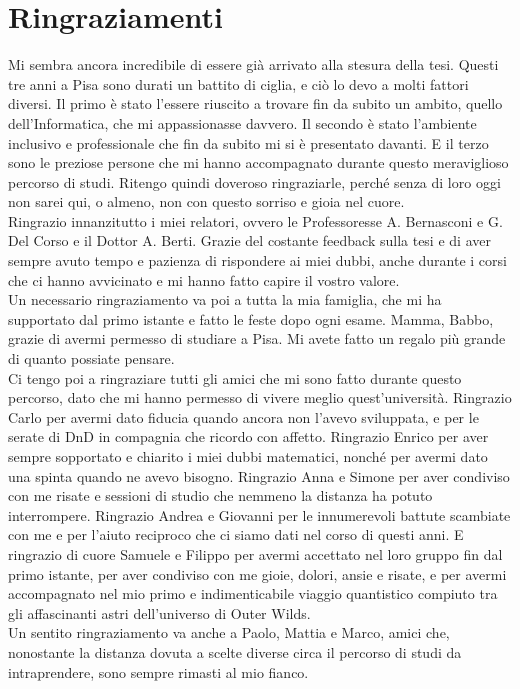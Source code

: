 \documentclass{book}
\theoremstyle{definition}
\theoremstyle{definition}
\theoremstyle{definition}
\theoremstyle{plain}
\theoremstyle{plain}
\theoremstyle{plain}
\theoremstyle{plain}
\begin{document}
\chapter*{Ringraziamenti}
Mi sembra ancora incredibile di essere già arrivato alla stesura della tesi. Questi tre anni a Pisa sono durati un battito di ciglia, e ciò lo devo a molti fattori diversi. Il primo è stato l'essere riuscito a trovare fin da subito un ambito, quello dell'Informatica, che mi appassionasse davvero. Il secondo è stato l'ambiente inclusivo e professionale che fin da subito mi si è presentato davanti. E il terzo sono le preziose persone che mi hanno accompagnato durante questo meraviglioso percorso di studi. Ritengo quindi doveroso ringraziarle, perché senza di loro oggi non sarei qui, o almeno, non con questo sorriso e gioia nel cuore.\\
\indent Ringrazio innanzitutto i miei relatori, ovvero le Professoresse A. Bernasconi e G. Del Corso e il Dottor A. Berti. Grazie del costante feedback sulla tesi e di aver sempre avuto tempo e pazienza di rispondere ai miei dubbi, anche durante i corsi che ci hanno avvicinato e mi hanno fatto capire il vostro valore.\\
\indent Un necessario ringraziamento va poi a tutta la mia famiglia, che mi ha supportato dal primo istante e fatto le feste dopo ogni esame. Mamma, Babbo, grazie di avermi permesso di studiare a Pisa. Mi avete fatto un regalo più grande di quanto possiate pensare.\\
\indent Ci tengo poi a ringraziare tutti gli amici che mi sono fatto durante questo percorso, dato che mi hanno permesso di vivere meglio quest'università. Ringrazio Carlo per avermi dato fiducia quando ancora non l'avevo sviluppata, e per le serate di DnD in compagnia che ricordo con affetto. Ringrazio Enrico per aver sempre sopportato e chiarito i miei dubbi matematici, nonché per avermi dato una spinta quando ne avevo bisogno.
Ringrazio Anna e Simone per aver condiviso con me risate e sessioni di studio che nemmeno la distanza ha potuto interrompere. Ringrazio Andrea e Giovanni per le innumerevoli battute scambiate con me e per l'aiuto reciproco che ci siamo dati nel corso di questi anni. E ringrazio di cuore Samuele e Filippo per avermi accettato nel loro gruppo fin dal primo istante, per aver condiviso con me gioie, dolori, ansie e risate, e per avermi accompagnato nel mio primo e indimenticabile viaggio quantistico compiuto tra gli affascinanti astri dell'universo di Outer Wilds.\\
\indent Un sentito ringraziamento va anche a Paolo, Mattia e Marco, amici che, nonostante la distanza dovuta a scelte diverse circa il percorso di studi da intraprendere, sono sempre rimasti al mio fianco.\\
\end{document}
